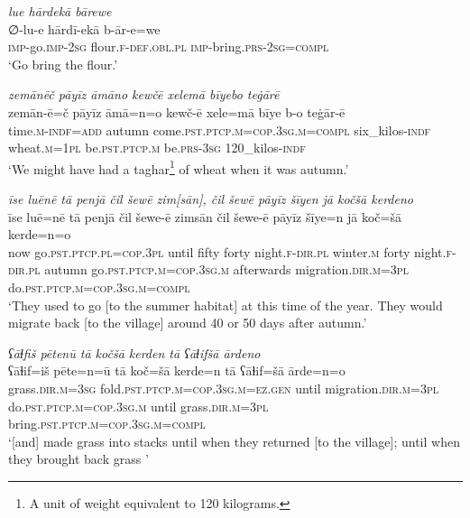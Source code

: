\ea \label{RE.19}
\textit{lue hārdekā bārewe} \\ 
\gll ∅-lu-e hārdī-ekā b-ār-e=we \\ 
 \textsc{imp-}go.\textsc{imp-}\textsc{2sg} flour\textsc{.f}\textsc{-def}\textsc{.obl}\textsc{.pl} \textsc{imp-}bring\textsc{.prs}-\textsc{2sg}\textsc{=compl} \\ 
\glt `Go bring the flour.'
\z 
 
\ea \label{RE.70}
\textit{zemānēč pāyīz āmāno kewčē xelemā bīyebo teġārē} \\ 
\gll zemān-ē=č pāyīz āmā=n=o kewč-ē xele=mā bīye b-o teġār-ē \\ 
 time\textsc{.m}\textsc{-indf}\textsc{=add} autumn come\textsc{.pst}\textsc{.ptcp}\textsc{.m}\textsc{=cop}\textsc{.3sg}\textsc{.m}\textsc{=compl} six\_kilos\textsc{-indf} wheat\textsc{.m}\textsc{=\textsc{1pl}} be\textsc{.pst}\textsc{.ptcp}\textsc{.m} be\textsc{.prs}\textsc{-3sg} 120\_kilos\textsc{-indf} \\ 
\glt `We might have had a taghar\footnote{A unit of weight equivalent to 120 kilograms.} of wheat when it was autumn.'
\z 
 
\ea \label{ŽE.9}
\textit{īse luēnē tā penjā čil šewē zim[sān], čil šewē pāyīz šīyen jā kočšā kerdeno} \\ 
\gll īse luē=nē tā penjā čil šewe-ē zimsān čil šewe-ē pāyīz šīye=n jā koč=šā kerde=n=o \\ 
 now go\textsc{.pst}\textsc{.ptcp}\textsc{.pl}\textsc{=cop}\textsc{.3pl} until fifty forty night\textsc{.f}\textsc{-dir}\textsc{.pl} winter\textsc{.m} forty night\textsc{.f}\textsc{-dir}\textsc{.pl} autumn go\textsc{.pst}\textsc{.ptcp}\textsc{.m}\textsc{=cop}\textsc{.3sg}\textsc{.m} afterwards migration\textsc{.dir}\textsc{.m}\textsc{=3pl} do\textsc{.pst}\textsc{.ptcp}\textsc{.m}\textsc{=cop}\textsc{.3sg}\textsc{.m}\textsc{=compl} \\ 
\glt `They used to go [to the summer habitat] at this time of the year. They would migrate back [to the village] around 40 or 50 days after autumn.'
\z 
 
\ea \label{ŽE.13}
\textit{ʕāɫfiš pētenū tā kočšā kerden tā ʕāɫifšā ārdeno} \\ 
\gll ʕāɫif=iš pēte=n=ū tā koč=šā kerde=n tā ʕāɫif=šā ārde=n=o \\ 
 grass\textsc{.dir}\textsc{.m}\textsc{=3sg} fold\textsc{.pst}\textsc{.ptcp}\textsc{.m}\textsc{=cop}\textsc{.3sg}\textsc{.m}\textsc{\textsc{=ez.gen}} until migration\textsc{.dir}\textsc{.m}\textsc{=3pl} do\textsc{.pst}\textsc{.ptcp}\textsc{.m}\textsc{=cop}\textsc{.3sg}\textsc{.m} until grass\textsc{.dir}\textsc{.m}\textsc{=3pl} bring\textsc{.pst}\textsc{.ptcp}\textsc{.m}\textsc{=cop}\textsc{.3sg}\textsc{.m}\textsc{=compl} \\ 
\glt `[and] made grass into stacks until when they returned [to the village]; until when they brought back grass '
\z 
 
